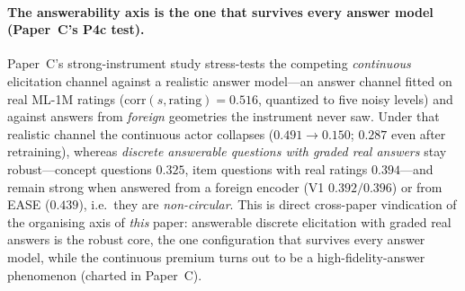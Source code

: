 \documentclass[11pt]{article}
\begin{document}
\paragraph{The answerability axis is the one that survives every answer model (Paper~C's P4c test).} Paper~C's
strong-instrument study stress-tests the competing \emph{continuous} elicitation channel against a realistic answer
model---an answer channel fitted on real ML-1M ratings ($\mathrm{corr}(s,\text{rating})=0.516$, quantized to five noisy
levels) and against answers from \emph{foreign} geometries the instrument never saw. Under that realistic channel the
continuous actor collapses ($0.491\to0.150$; $0.287$ even after retraining), whereas \emph{discrete answerable questions
with graded real answers} stay robust---concept questions $0.325$, item questions with real ratings $0.394$---and remain
strong when answered from a foreign encoder (V1 $0.392/0.396$) or from EASE ($0.439$), i.e.\ they are \emph{non-circular}.
This is direct cross-paper vindication of the organising axis of \emph{this} paper: answerable discrete elicitation with
graded real answers is the robust core, the one configuration that survives every answer model, while the continuous
premium turns out to be a high-fidelity-answer phenomenon (charted in Paper~C).
\end{document}
